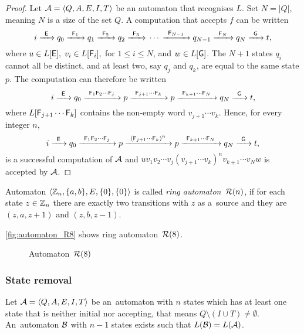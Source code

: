 \begin{proof}
    Let ${\mathcal{A}} = \langle Q, A, E, I, T \rangle$ be an automaton that recognises $L$. Set $N = |Q|$, meaning $N$ is a size of the set $Q$. A computation that accepts $f$ can be written
    \[
        i {\; \xrightarrow[]{\: \; {\mathsf{E}} \: \;} \;} q_0 {\; \xrightarrow[]{\: \; {\mathsf{F}}_1 \: \;} \;} q_1 {\; \xrightarrow[]{\: \; {\mathsf{F}}_2 \: \;} \;} q_2 {\; \xrightarrow[]{\: \; {\mathsf{F}}_3 \: \;} \;} \dotsm {\; \xrightarrow[]{\: \; {\mathsf{F}}_{N-1} \: \;} \;} q_{N-1} {\; \xrightarrow[]{\: \; {\mathsf{F}}_{N} \: \;} \;} q_N {\; \xrightarrow[]{\: \; {\mathsf{G}} \: \;} \;} t,
    \]
    where $u \in L[{\mathsf{E}}], \; v_i \in L[{\mathsf{F}}_i], $ for $ 1 \leq i \leq N$, and $w \in L[{\mathsf{G}}]$. The $N + 1$ states $q_i$ cannot all be distinct, and at least two, say $q_j$ and $q_k$, are equal to the same state $p$. The computation can therefore be written
    \[
        i {\; \xrightarrow[]{\: \; {\mathsf{E}} \: \;} \;} q_0 {\; \xrightarrow[]{\: \; {\mathsf{F}}_1 {\mathsf{F}}_2 \dotsm {\mathsf{F}}_j \: \;} \;} p {\; \xrightarrow[]{\: \; {\mathsf{F}}_{j+1} \dotsm {\mathsf{F}}_k \: \;} \;} p {\; \xrightarrow[]{\: \; {\mathsf{F}}_{k+1} \dotsm {\mathsf{F}}_N \: \;} \;} q_N {\; \xrightarrow[]{\: \; {\mathsf{G}} \: \;} \;} t,
    \]
    where $L[{\mathsf{F}}_{j+1} \dotsm {\mathsf{F}}_k]$ contains the non-empty word $v_{j+1} \dotsm v_k$. Hence, for every integer $n$,
    \[
        i {\; \xrightarrow[]{\: \; {\mathsf{E}} \: \;} \;} q_0 {\; \xrightarrow[]{\: \; {\mathsf{F}}_1 {\mathsf{F}}_2 \dotsm {\mathsf{F}}_j \: \;} \;} p {\; \xrightarrow[]{\: \; {({\mathsf{F}}_{j+1} \dotsm {\mathsf{F}}_k)}^n \: \;} \;} p {\; \xrightarrow[]{\: \; {\mathsf{F}}_{k+1} \dotsm {\mathsf{F}}_N \: \;} \;} q_N {\; \xrightarrow[]{\: \; {\mathsf{G}} \: \;} \;} t,
    \]
    is a successful computation of ${\mathcal{A}}$ and $u v_1 v_2 \dotsm v_j {(v_{j+1} \dotsm v_k)}^n v_{k+1} \dotsm v_N w$ is accepted by ${\mathcal{A}}$.
\end{proof}

\begin{defn}
    Automaton $\langle \mathbb{Z}_n, \{a,b\}, E, \{0\}, \{0\} \rangle$ is called \emph{ring automaton~${{\mathcal{R}}(n)}$}, if for each state $z \in \mathbb{Z}_n$ there are exactly two transitions with $z$ as a~source and they are $(z, a, z+1)$ and $(z, b, z-1)$.
\end{defn}

\begin{example}
    \autoref*{fig:automaton_R8} shows ring automaton~${{\mathcal{R}}(8)}$.

    \begin{figure}[h]
        \centering
        
        \caption{Automaton~${{\mathcal{R}}(8)}$}\label{fig:automaton_R8}
    \end{figure}
\end{example}

\subsubsection*{State removal }

\begin{lemma}\label{lm:state_removal_lemma}
    Let ${\mathcal{A}} = \langle Q, A, E, I, T \rangle$ be an~automaton with $n$ states which has at least one state that is neither initial nor accepting, that means $Q \setminus (I \cup T) \neq \emptyset$. An~automaton ${\mathcal{B}}$ with $n - 1$ states exists such that $L({\mathcal{B}}) = L({\mathcal{A}})$.
\end{lemma}

